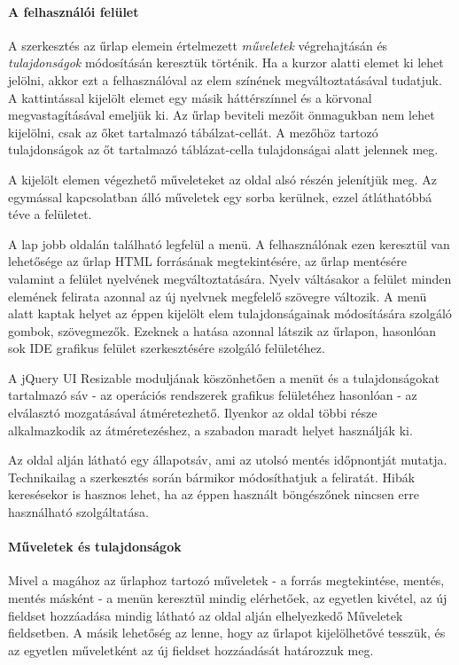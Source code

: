 \documentclass[12pt,a4paper,twoside]{article}
\begin{document}
\paragraph{A felhasználói felület}
A szerkesztés az űrlap elemein értelmezett \textit{műveletek} végrehajtásán és
\textit{tulajdonságok} módosításán keresztük történik. Ha a kurzor alatti elemet
ki lehet jelölni, akkor ezt a felhasználóval az elem színének megváltoztatásával
tudatjuk. A kattintással kijelölt elemet egy másik háttérszínnel és a körvonal
megvastagításával emeljük ki. Az űrlap beviteli mezőit önmagukban nem lehet
kijelölni, csak az őket tartalmazó tábálzat-cellát. A mezőhöz tartozó
tulajdonságok az őt tartalmazó táblázat-cella tulajdonságai alatt jelennek meg.

A kijelölt elemen végezhető műveleteket az oldal alsó részén jelenítjük meg. Az
egymással kapcsolatban álló műveletek egy sorba kerülnek, ezzel átláthatóbbá
téve a felületet.

A lap jobb oldalán található legfelül a menü. A felhasználónak ezen keresztül
van lehetősége az űrlap HTML forrásának megtekintésére, az űrlap mentésére
valamint a felület nyelvének megváltoztatására. Nyelv váltásakor a felület
minden elemének felirata azonnal az új nyelvnek megfelelő szövegre változik.
A menü alatt kaptak helyet az éppen kijelölt elem tulajdonságainak módosítására
szolgáló gombok, szövegmezők. Ezeknek a hatása azonnal látszik az űrlapon,
hasonlóan sok IDE grafikus felület szerkesztésére szolgáló felületéhez.

A jQuery UI Resizable moduljának köszönhetően a menüt és a tulajdonságokat
tartalmazó sáv - az operációs rendszerek grafikus felületéhez hasonlóan - az
elválasztó mozgatásával átméretezhető. Ilyenkor az oldal többi része
alkalmazkodik az átméretezéshez, a szabadon maradt helyet használják ki.

Az oldal alján látható egy állapotsáv, ami az utolsó mentés időpnontját
mutatja. Technikailag a szerkesztés során bármikor módosíthatjuk a
feliratát. Hibák keresésekor is hasznos lehet, ha az éppen használt böngészőnek
nincsen erre használható szolgáltatása.

\clearpage
\paragraph{Műveletek és tulajdonságok}
Mivel a magához az űrlaphoz tartozó műveletek - a forrás megtekintése,
mentés, mentés másként - a menün keresztül mindig elérhetőek, az egyetlen
kivétel, az új fieldset hozzáadása mindig látható az oldal alján elhelyezkedő
Műveletek fieldsetben. A másik lehetőség az lenne, hogy az űrlapot kijelölhetővé
tesszük, és az egyetlen műveletként az új fieldset hozzáadását határozzuk meg.
\end{document}
